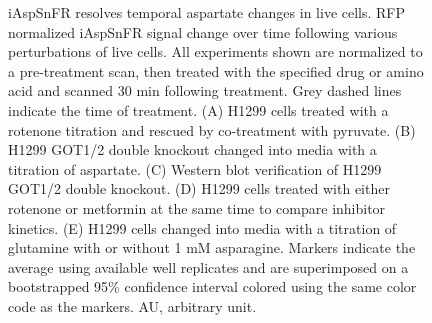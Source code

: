 \documentclass[9pt,lineno]{elife}
\begin{document}
\begin{figure}[ht!]
\centering
{}
\caption{
iAspSnFR resolves temporal aspartate changes in live cells.
RFP normalized iAspSnFR signal change over time following various perturbations of live cells.
All experiments shown are normalized to a pre-treatment scan, then treated with the specified drug or amino acid and scanned 30 min following treatment.
Grey dashed lines indicate the time of treatment.
(A) H1299 cells treated with a rotenone titration and rescued by co-treatment with pyruvate.
(B) H1299 GOT1/2 double knockout changed into media with a titration of aspartate.
(C) Western blot verification of H1299 GOT1/2 double knockout.
(D) H1299 cells treated with either rotenone or metformin at the same time to compare inhibitor kinetics.
(E) H1299 cells changed into media with a titration of glutamine with or without 1 mM asparagine.
Markers indicate the average using available well replicates and are superimposed on a bootstrapped 95\% confidence interval colored using the same color code as the markers.
AU, arbitrary unit.
}
\label{fig:Fig2}
\end{figure}
\end{document}
